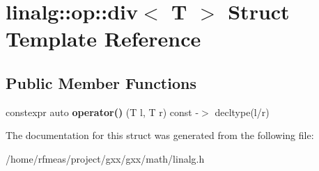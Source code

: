 \hypertarget{structlinalg_1_1op_1_1div}{}\section{linalg\+:\+:op\+:\+:div$<$ T $>$ Struct Template Reference}
\label{structlinalg_1_1op_1_1div}
\subsection*{Public Member Functions}
\begin{DoxyCompactItemize}
\item 
constexpr auto {\bfseries operator()} (T l, T r) const -\/$>$ decltype(l/r)\hypertarget{structlinalg_1_1op_1_1div_ab1e9c67d78f78cb9c297bc88e7da4e36}{}\label{structlinalg_1_1op_1_1div_ab1e9c67d78f78cb9c297bc88e7da4e36}

\end{DoxyCompactItemize}


The documentation for this struct was generated from the following file\+:\begin{DoxyCompactItemize}
\item 
/home/rfmeas/project/gxx/gxx/math/linalg.\+h\end{DoxyCompactItemize}
